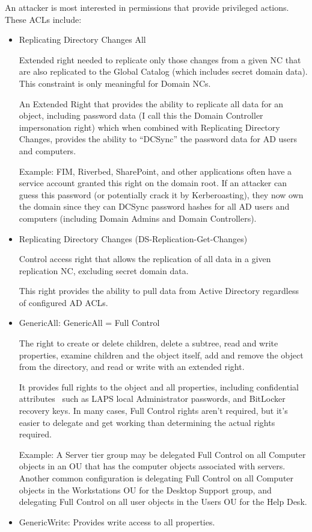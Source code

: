 An attacker is most interested in permissions that provide privileged actions. These ACLs include:

\begin{itemize}
    \item Replicating Directory Changes All

Extended right needed to replicate only those changes from a given NC that are also replicated to the Global Catalog (which includes secret domain data). This constraint is only meaningful for Domain NCs.

An Extended Right that provides the ability to replicate all data for an object, including password data (I call this the Domain Controller impersonation right) which when combined with Replicating Directory Changes, provides the ability to “DCSync” the password data for AD users and computers.

Example: FIM, Riverbed, SharePoint, and other applications often have a service account granted this right on the domain root. If an attacker can guess this password (or potentially crack it by Kerberoasting), they now own the domain since they can DCSync password hashes for all AD users and computers (including Domain Admins and Domain Controllers).
    \item Replicating Directory Changes (DS-Replication-Get-Changes)

Control access right that allows the replication of all data in a given replication NC, excluding secret domain data.

This right provides the ability to pull data from Active Directory regardless of configured AD ACLs.
    \item GenericAll: GenericAll = Full Control

The right to create or delete children, delete a subtree, read and write properties, examine children and the object itself, add and remove the object from the directory, and read or write with an extended right.

It provides full rights to the object and all properties, including confidential attributes  such as LAPS local Administrator passwords, and BitLocker recovery keys. In many cases, Full Control rights aren’t required, but it’s easier to delegate and get working than determining the actual rights required.

Example: A Server tier group may be delegated Full Control on all Computer objects in an OU that has the computer objects associated with servers. Another common configuration is delegating Full Control on all Computer objects in the Workstations OU for the Desktop Support group, and delegating Full Control on all user objects in the Users OU for the Help Desk.
    \item GenericWrite: Provides write access to all properties.


\end{itemize}
